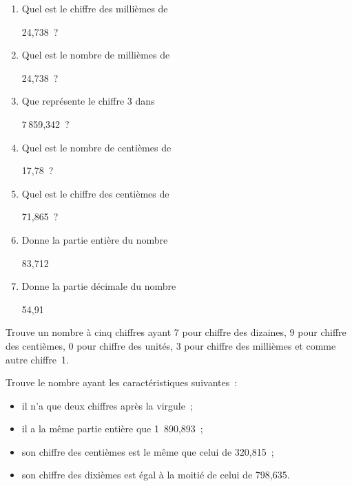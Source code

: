 \begin{exercice}
\begin{enumerate}
 \item Quel est le chiffre des millièmes de 
 
24,738 ? \dotfill
 \item Quel est le nombre de millièmes de 
 
24,738 ? \dotfill
 \item Que représente le chiffre 3 dans 
 
7\,859,342 ? \dotfill
 \item Quel est le nombre de centièmes de 
 
17,78 ? \dotfill
 \item Quel est le chiffre des centièmes de 
 
71,865 ? \dotfill
 \item Donne la partie entière du nombre 
 
83,712 \dotfill
 \item Donne la partie décimale du nombre 
 
54,91 \dotfill
 \end{enumerate}
\end{exercice}


\begin{exercice}
Trouve un nombre à cinq chiffres ayant 7 pour chiffre des dizaines, 9 pour chiffre des centièmes, 0 pour chiffre des unités, 3 pour chiffre des millièmes et comme autre chiffre 1.
\end{exercice}


\begin{exercice}[Devinette]
Trouve le nombre ayant les caractéristiques suivantes :
\begin{itemize}
 \item il n'a que deux chiffres après la virgule ;
 \item il a la même partie entière que 1 890,893 ;
 \item son chiffre des centièmes est le même que celui de 320,815 ;
 \item son chiffre des dixièmes est égal à la moitié de celui de 798,635.
 \end{itemize}
\end{exercice}


